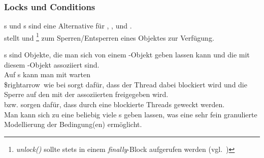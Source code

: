 \subsubsection{Locks und Conditions}\label{subsubsec:locksconditions}
s und s sind eine Alternative für , , und .\\

\noindent
{} stellt  und \footnote{
    \textit{unlock()} sollte stets in einem \textit{finally}-Block aufgerufen werden (vgl.~\cite[150]{Oec22})
} zum Sperren/Entsperren eines Objektes zur Verfügung.

\noindent
{}s sind Objekte, die man sich von einem -Objekt geben lassen kann und die mit diesem -Objekt assoziiert sind.\\
Auf s kann man mit  warten\\
\$rightarrow\ wie bei  sorgt  dafür, dass der Thread dabei blockiert wird und die Sperre auf den mit der  assoziierten  freigegeben wird.\\
 bzw.  sorgen dafür, dass durch eine  blockierte Threads geweckt werden.\\

\noindent
Man kann sich zu eine  beliebig viele s geben lassen, was eine sehr fein granulierte Modellierung der Bedingung(en) ermöglicht.\\

